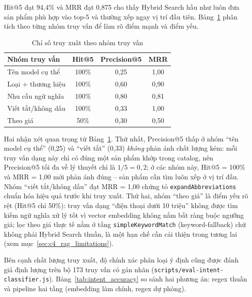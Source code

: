 Hit@5 đạt 94,4\% và MRR đạt 0,875 cho thấy Hybrid Search hầu như luôn đưa sản phẩm phù hợp vào top-5 và thường xếp ngay vị trí đầu tiên. Bảng~\ref{tab:retrieval_by_group} phân tích theo từng nhóm truy vấn để làm rõ điểm mạnh và điểm yếu.

\begin{table}[H]
  \centering
  \caption{Chỉ số truy xuất theo nhóm truy vấn}
  \label{tab:retrieval_by_group}
  \begin{tabular}{|l|c|c|c|}
    \hline
    \textbf{Nhóm truy vấn} & \textbf{Hit@5} & \textbf{Precision@5} & \textbf{MRR} \\
    \hline
    Tên model cụ thể & 100\% & 0,25 & 1,00 \\
    \hline
    Loại + thương hiệu & 100\% & 0,60 & 0,90 \\
    \hline
    Nhu cầu ngữ nghĩa & 100\% & 0,80 & 0,81 \\
    \hline
    Viết tắt\slash không dấu & 100\% & 0,33 & 1,00 \\
    \hline
    Theo giá & 50\% & 0,30 & 0,50 \\
    \hline
  \end{tabular}
\end{table}

Hai nhận xét quan trọng từ Bảng~\ref{tab:retrieval_by_group}. Thứ nhất, Precision@5 thấp ở nhóm ``tên model cụ thể'' (0,25) và ``viết tắt'' (0,33) \textit{không} phản ánh chất lượng kém: mỗi truy vấn dạng này chỉ có đúng một sản phẩm khớp trong catalog, nên Precision@5 tối đa về lý thuyết chỉ là $1/5 = 0{,}2$; ở các nhóm này, Hit@5 = 100\% và MRR = 1,00 mới phản ánh đúng -- sản phẩm cần tìm luôn xếp ở vị trí đầu. Nhóm ``viết tắt\slash không dấu'' đạt MRR = 1,00 chứng tỏ \texttt{expandAbbreviations} chuẩn hóa hiệu quả trước khi truy xuất. Thứ hai, nhóm ``theo giá'' là điểm yếu rõ rệt (Hit@5 chỉ 50\%): truy vấn dạng ``điện thoại dưới 10 triệu'' không được tìm kiếm ngữ nghĩa xử lý tốt vì vector embedding không nắm bắt ràng buộc ngưỡng giá; lọc theo giá thực tế nằm ở tầng \texttt{simpleKeywordMatch} (keyword-fallback) chứ không phải Hybrid Search thuần, là một hạn chế cần cải thiện trong tương lai (xem mục~\ref{sec:c4_rag_limitations}).

Bên cạnh chất lượng truy xuất, độ chính xác phân loại ý định cũng được đánh giá định lượng trên bộ 173 truy vấn có gán nhãn (\texttt{scripts/\allowbreak eval-intent-\allowbreak classifier.js}). Bảng~\ref{tab:intent_accuracy} so sánh hai phương án: regex thuần và pipeline hai tầng (embedding làm chính, regex dự phòng).

